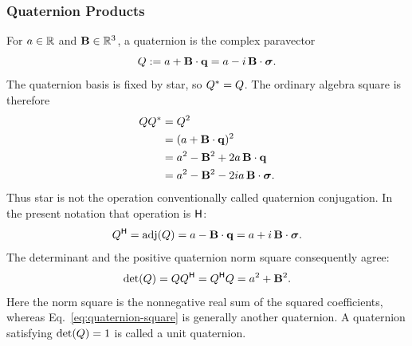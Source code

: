 \subsubsection{Quaternion Products}
For \(a\in\mathbb{R}\) and \(\mathbf{B}\in\mathbb{R}^3\), a quaternion is the complex
paravector
\begin{equation}
Q:=a+\mathbf{B}\cdot\mathbf{q}
=a-i\,\mathbf{B}\cdot\mathbf{\bm{\sigma}}.
\label{eq:quaternion-paravector}
\end{equation}
The quaternion basis is fixed by star, so
\(Q^{*}=Q\). The ordinary algebra square is therefore
\begin{align}
QQ^{*}
&=Q^{2}\notag\\
&=(a+\mathbf{B}\cdot\mathbf{q})^{2}\notag\\
&=a^{2}-\mathbf{B}^{2}+2a\,\mathbf{B}\cdot\mathbf{q}\notag\\
&=a^{2}-\mathbf{B}^{2}-2ia\,\mathbf{B}\cdot\mathbf{\bm{\sigma}}.
\label{eq:quaternion-square}
\end{align}
Thus star is not the operation conventionally called quaternion
conjugation. In the present notation that operation is \(\mathsf H\):
\begin{equation*}
Q^{\mathsf H}
=\operatorname{adj}\!\left(Q\right)
=a-\mathbf{B}\cdot\mathbf{q}
=a+i\,\mathbf{B}\cdot\mathbf{\bm{\sigma}}.
\end{equation*}
The determinant and the positive quaternion norm square consequently agree:
\begin{equation}
\operatorname{det}\!\left(Q\right)
=QQ^{\mathsf H}
=Q^{\mathsf H}Q
=a^{2}+\mathbf{B}^{2}.
\label{eq:quaternion-norm}
\end{equation}
Here the norm square is the nonnegative real sum of the squared coefficients,
whereas Eq.\ \eqref{eq:quaternion-square} is generally another quaternion.
A quaternion satisfying \(\operatorname{det}\!\left(Q\right)=1\) is called a unit quaternion.

